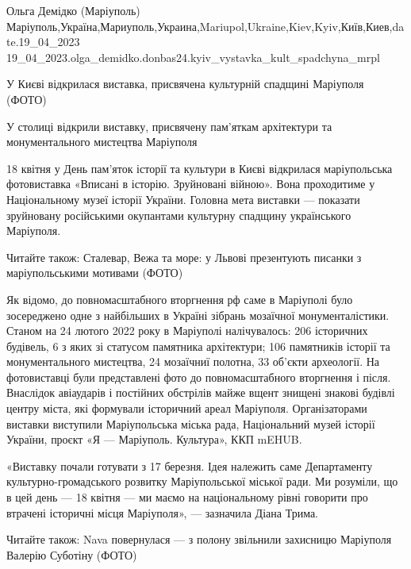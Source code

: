  
 
 
 
 

Ольга Демідко (Маріуполь)
Маріуполь,Україна,Мариуполь,Украина,Mariupol,Ukraine,Kiev,Kyiv,Київ,Киев,date.19_04_2023
19_04_2023.olga_demidko.donbas24.kyiv_vystavka_kult_spadchyna_mrpl

У Києві відкрилася виставка, присвячена культурній спадщині Маріуполя (ФОТО)

У столиці відкрили виставку, присвячену пам’яткам архітектури та
монументального мистецтва Маріуполя

18 квітня у День пам’яток історії та культури в Києві відкрилася маріупольська
фотовиставка «Вписані в історію. Зруйновані війною». Вона проходитиме у
Національному музеї історії України. Головна мета виставки — показати
зруйновану російськими окупантами культурну спадщину українського Маріуполя.

Читайте також: Сталевар, Вежа та море: у Львові презентують писанки з
маріупольськими мотивами (ФОТО)

Як відомо, до повномасштабного вторгнення рф саме в Маріуполі було зосереджено
одне з найбільших в Україні зібрань мозаїчної монументалістики. Станом на 24
лютого 2022 року в Маріуполі налічувалось: 206 історичних будівель, 6 з яких зі
статусом памятника архітектури; 106 памятників історії та монументального
мистецтва, 24 мозаїчниї полотна, 33 об'єкти археології. На фотовиставці були
представлені фото до повномасштабного вторгнення і після. Внаслідок авіаударів
і постійних обстрілів майже вщент знищені знакові будівлі центру міста, які
формували історичний ареал Маріуполя. Організаторами виставки виступили
Маріупольська міська рада, Національний музей історії України, проєкт «Я —
Маріуполь. Культура», ККП mEHUB.

«Виставку почали готувати з 17 березня. Ідея належить саме Департаменту
культурно-громадського розвитку Маріупольської міської ради. Ми розуміли, що в
цей день — 18 квітня — ми маємо на національному рівні говорити про втрачені
історичні місця Маріуполя», — зазначила Діана Трима.

Читайте також: Nava повернулася — з полону звільнили захисницю Маріуполя
Валерію Суботіну (ФОТО)


